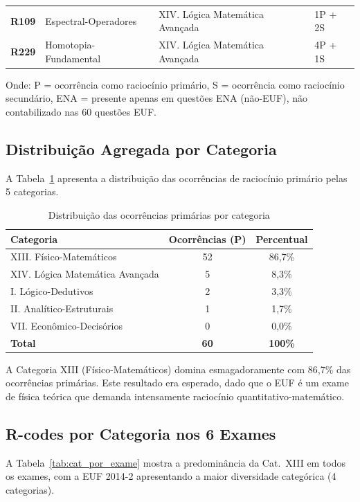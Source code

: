 \documentclass[12pt,a4paper]{article}
\newcommand{\rcode}[1]{\textcolor{azulprof}{\textbf{#1}}}
\begin{document}
\begin{longtable}{@{}p{2.2cm}p{3.8cm}p{3cm}p{4.5cm}@{}}
\rcode{R109} & Espectral-Operadores
  & XIV. Lógica Matemática Avançada & 1P + 2S \\
\rcode{R229} & Homotopia-Fundamental
  & XIV. Lógica Matemática Avançada & 4P + 1S \\
\bottomrule
\end{longtable}

\noindent Onde: P = ocorrência como raciocínio primário, S = ocorrência
como raciocínio secundário, ENA = presente apenas em questões ENA
(não-EUF), não contabilizado nas 60 questões EUF.

\subsection{Distribuição Agregada por Categoria}

A Tabela~\ref{tab:categorias_agregadas} apresenta a distribuição das
ocorrências de raciocínio primário pelas 5 categorias.

\begin{table}[H]
\centering
\caption{Distribuição das ocorrências primárias por categoria}
\label{tab:categorias_agregadas}
\begin{tabular}{lcc}
\toprule
\textbf{Categoria} & \textbf{Ocorrências (P)} & \textbf{Percentual} \\
\midrule
XIII. Físico-Matemáticos & 52 & 86,7\% \\
XIV. Lógica Matemática Avançada & 5 & 8,3\% \\
I. Lógico-Dedutivos & 2 & 3,3\% \\
II. Analítico-Estruturais & 1 & 1,7\% \\
VII. Econômico-Decisórios & 0 & 0,0\% \\
\midrule
\textbf{Total} & \textbf{60} & \textbf{100\%} \\
\bottomrule
\end{tabular}
\end{table}

A Categoria XIII (Físico-Matemáticos) domina esmagadoramente com 86,7\%
das ocorrências primárias. Este resultado era esperado, dado que o EUF
é um exame de física teórica que demanda intensamente raciocínio
quantitativo-matemático.

\subsection{R-codes por Categoria nos 6 Exames}

A Tabela~\ref{tab:cat_por_exame} mostra a predominância da Cat.~XIII
em todos os exames, com a EUF 2014-2 apresentando a maior diversidade
categórica (4 categorias).
\end{document}
